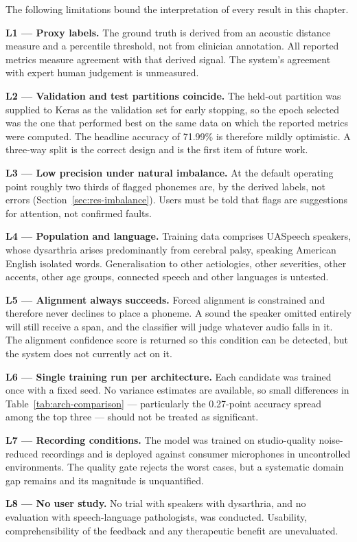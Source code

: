 The following limitations bound the interpretation of every result in this
chapter.

\textbf{L1 --- Proxy labels.} The ground truth is derived from an acoustic
distance measure and a percentile threshold, not from clinician annotation. All
reported metrics measure agreement with that derived signal. The system's
agreement with expert human judgement is unmeasured.

\textbf{L2 --- Validation and test partitions coincide.} The held-out partition
was supplied to Keras as the validation set for early stopping, so the epoch
selected was the one that performed best on the same data on which the reported
metrics were computed. The headline accuracy of 71.99\% is therefore mildly
optimistic. A three-way split is the correct design and is the first item of
future work.

\textbf{L3 --- Low precision under natural imbalance.} At the default operating
point roughly two thirds of flagged phonemes are, by the derived labels, not
errors (Section~\ref{sec:res-imbalance}). Users must be told that flags are
suggestions for attention, not confirmed faults.

\textbf{L4 --- Population and language.} Training data comprises UASpeech
speakers, whose dysarthria arises predominantly from cerebral palsy, speaking
American English isolated words. Generalisation to other aetiologies, other
severities, other accents, other age groups, connected speech and other
languages is untested.

\textbf{L5 --- Alignment always succeeds.} Forced alignment is constrained and
therefore never declines to place a phoneme. A sound the speaker omitted
entirely will still receive a span, and the classifier will judge whatever audio
falls in it. The alignment confidence score is returned so this condition can be
detected, but the system does not currently act on it.

\textbf{L6 --- Single training run per architecture.} Each candidate was trained
once with a fixed seed. No variance estimates are available, so small
differences in Table~\ref{tab:arch-comparison} --- particularly the 0.27-point
accuracy spread among the top three --- should not be treated as significant.

\textbf{L7 --- Recording conditions.} The model was trained on studio-quality
noise-reduced recordings and is deployed against consumer microphones in
uncontrolled environments. The quality gate rejects the worst cases, but a
systematic domain gap remains and its magnitude is unquantified.

\textbf{L8 --- No user study.} No trial with speakers with dysarthria, and no
evaluation with speech-language pathologists, was conducted. Usability,
comprehensibility of the feedback and any therapeutic benefit are unevaluated.
